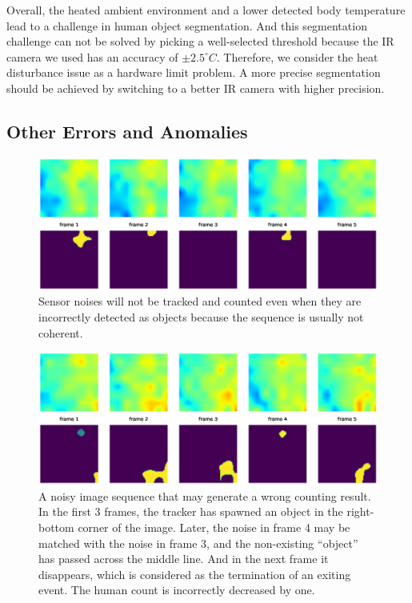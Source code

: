 Overall, the heated ambient environment and a lower detected body temperature lead to a challenge in human object segmentation. And this segmentation challenge can not be solved by picking a well-selected threshold because the IR camera we used has an accuracy of $\pm 2.5^\circ C$. Therefore, we consider the heat disturbance issue as a hardware limit problem. A more precise segmentation should be achieved by switching to a better IR camera with higher precision.

\subsection{Other Errors and Anomalies}
\begin{figure}
  \centering
  \includegraphics[width=\textwidth]{figures/err_noise1.eps}
  \caption{Sensor noises will not be tracked and counted even when they are incorrectly detected as objects because the sequence is usually not coherent.}\label{fig:err_no1}
\end{figure}
\begin{figure}
  \centering
  \includegraphics[width=\textwidth]{figures/err_noise2.eps}
  \caption{A noisy image sequence that may generate a wrong counting result. In the first 3 frames, the tracker has spawned an object in the right-bottom corner of the image. Later, the noise in frame 4 may be matched with the noise in frame 3, and the non-existing ``object'' has passed across the middle line. And in the next frame it disappears, which is considered as the termination of an exiting event. The human count is incorrectly decreased by one.}\label{fig:err_no2}
\end{figure}
